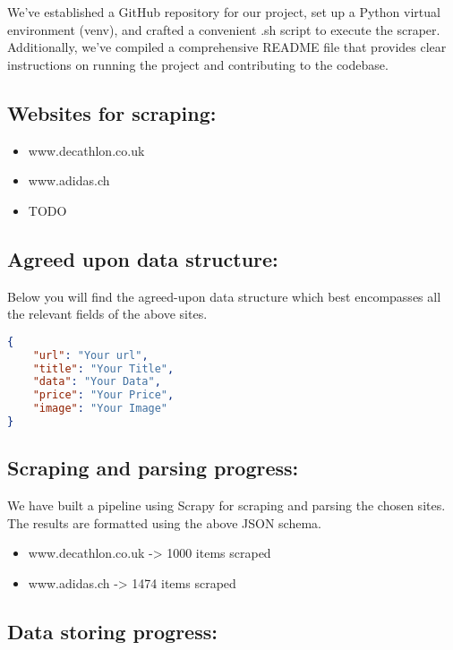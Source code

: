 \documentclass[unicode,11pt,a4paper,oneside,numbers=endperiod,openany]{scrartcl}
\begin{document}
We've established a GitHub repository for our project, set up a Python virtual environment (venv), and crafted a convenient .sh script to execute the scraper. Additionally, we've compiled a comprehensive README file that provides clear instructions on running the project and contributing to the codebase.


\subsection*{Websites for scraping:}
\begin{itemize}
    \item www.decathlon.co.uk
    \item www.adidas.ch
    \item TODO
\end{itemize}


\subsection*{Agreed upon data structure:}

Below you will find the agreed-upon data structure which best encompasses all the relevant fields of the above sites.

\begin{lstlisting}[language=json, caption=Agreed-upon JSON Schema]
{
    "url": "Your url",
    "title": "Your Title",
    "data": "Your Data",
    "price": "Your Price",
    "image": "Your Image"
}
\end{lstlisting}


\subsection*{Scraping and parsing progress:}

We have built a pipeline using Scrapy for scraping and parsing the chosen sites. The results are formatted using the above JSON schema.


\begin{itemize}
    \item www.decathlon.co.uk -> 1000 items scraped
    \item www.adidas.ch -> 1474 items scraped
\end{itemize}


\subsection*{Data storing progress:}
\end{document}
